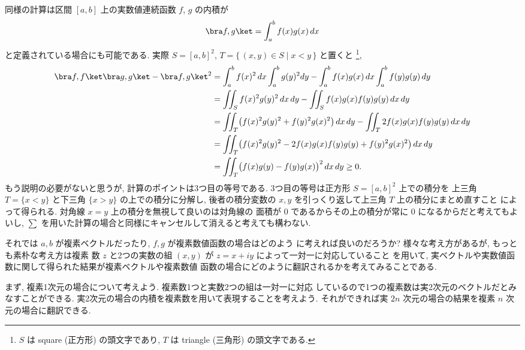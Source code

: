\documentclass[12pt,twoside]{jarticle}
\begin{document}
同様の計算は区間 $[a,b]$ 上の実数値連続函数 $f$, $g$ の内積が
\begin{equation*}
  \bra f, g\ket = \int_a^b f(x)g(x)\,dx
\end{equation*}
と定義されている場合にも可能である.
実際 $S=[a,b]^2$, $T = \{\,(x,y)\in S\mid x<y\,\}$ と置くと%
\footnote{$S$ は square (正方形) の頭文字であり, $T$ は triangle 
  (三角形) の頭文字である.},
{\small
\begin{align*}
  \bra f,f\ket \bra g,g\ket - \bra f,g\ket^2
  &
  = \int_a^b f(x)^2\,dx \int_a^b g(y)^2dy 
  - \int_a^b f(x)g(x)\,dx \int_a^b f(y)g(y)\,dy
  \\ &
  = \iint_S f(x)^2g(y)^2\,dx\,dy
  - \iint_S f(x)g(x)f(y)g(y)\,dx\,dy 
  \\ &
  = \iint_T \bigl(f(x)^2g(y)^2 + f(y)^2g(x)^2\bigr) \,dx\,dy
  - \iint_T 2f(x)g(x)f(y)g(y)\,dx\,dy
  \\ &
  = \iint_T \bigl(
      f(x)^2g(y)^2 - 2f(x)g(x)f(y)g(y) + f(y)^2g(x)^2
    \bigr) \,dx\,dy
  \\ &
  = \iint_T \bigl(f(x)g(y) - f(y)g(x)\bigr)^2 \,dx\,dy
  \ge 0.
\end{align*}
}もう説明の必要がないと思うが, 計算のポイントは3つ目の等号である.
3つ目の等号は正方形 $S=[a,b]^2$ 上での積分を
上三角 $T=\{x<y\}$ と下三角 $\{x>y\}$ の上での積分に分解し, 
後者の積分変数の $x,y$ を引っくり返して上三角 $T$ 上の積分にまとめ直すこと
によって得られる.  対角線 $x=y$ 上の積分を無視して良いのは対角線の
面積が $0$ であるからその上の積分が常に $0$ になるからだと考えてもよいし,
$\sum$ を用いた計算の場合と同様にキャンセルして消えると考えても構わない.

それでは $a,b$ が複素ベクトルだったり, $f,g$ が複素数値函数の場合はどのよう
に考えれば良いのだろうか?  様々な考え方があるが, もっとも素朴な考え方は複素
数 $z$ と2つの実数の組 $(x,y)$ が $z=x+iy$ によって一対一に対応していること
を用いて, 実ベクトルや実数値函数に関して得られた結果が複素ベクトルや複素数値
函数の場合にどのように翻訳されるかを考えてみることである.

まず, 複素1次元の場合について考えよう. 複素数1つと実数2つの組は一対一に対応
しているので1つの複素数は実2次元のベクトルだとみなすことができる.  
実2次元の場合の内積を複素数を用いて表現することを考えよう.
それができれば実 $2n$ 次元の場合の結果を複素 $n$ 次元の場合に翻訳できる.
\end{document}

